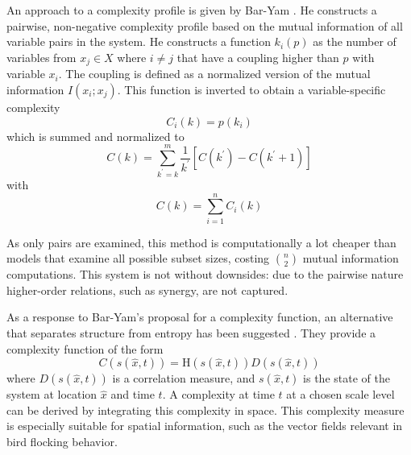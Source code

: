 \documentclass[../main.tex]{subfiles}
\begin{document}
An approach to a complexity profile is given by Bar-Yam \cite{bar2013computationally}.
He constructs a pairwise, non-negative complexity profile based on the mutual information of all variable pairs in the system.
He constructs a function $k_i (p)$ as the number of variables from $x_j \in X$ where $i \ne j$ that have a coupling higher than $p$ with variable $x_i$.
The coupling is defined as a normalized version of the mutual information $I(x_i;x_j)$.
This function is inverted to obtain a variable-specific complexity
%
\begin{equation}
\overset{~}{C}_i(k) = p(k_i)
\end{equation}
%
which is summed and normalized to
%
\begin{equation}
C(k) = \sum_{k^\prime= k}^m \frac{1}{k^\prime} [\overset{~}{C} (k^\prime) - \overset{~}{C} (k^\prime + 1)]
\end{equation}
%
with
%
\begin{equation}
\overset{~}{C} (k) = \sum_{i=1}^n \overset{~}{C}_i (k)
\end{equation}

As only pairs are examined, this method is computationally a lot cheaper than models that examine all possible subset sizes, costing $\binom{n}{2}$ mutual information computations.
This system is not without downsides: due to the pairwise nature higher-order relations, such as synergy, are not captured.

As a response to Bar-Yam's proposal for a complexity function, an alternative that separates structure from entropy has been suggested \cite{arbona2014statistical}.
They provide a complexity function of the form
%
\begin{equation}
C(s(\hat{x},t)) = \mathrm{H}(s(\hat{x},t)) D(s(\hat{x},t))
\end{equation}
%
where $D(s(\hat{x},t))$ is a correlation measure, and $s(\hat{x},t)$ is the state of the system at location $\hat{x}$ and time $t$.
A complexity at time $t$ at a chosen scale level can be derived by integrating this complexity in space.
This complexity measure is especially suitable for spatial information, such as the vector fields relevant in bird flocking behavior.
\end{document}
